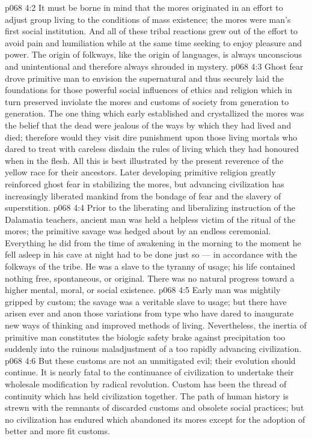 \vs p068 4:2 It must be borne in mind that the mores originated in an effort to adjust group living to the conditions of mass existence; the mores were man’s first social institution. And all of these tribal reactions grew out of the effort to avoid pain and humiliation while at the same time seeking to enjoy pleasure and power. The origin of folkways, like the origin of languages, is always unconscious and unintentional and therefore always shrouded in mystery.
\vs p068 4:3 \pc Ghost fear drove primitive man to envision the supernatural and thus securely laid the foundations for those powerful social influences of ethics and religion which in turn preserved inviolate the mores and customs of society from generation to generation. The one thing which early established and crystallized the mores was the belief that the dead were jealous of the ways by which they had lived and died; therefore would they visit dire punishment upon those living mortals who dared to treat with careless disdain the rules of living which they had honoured when in the flesh. All this is best illustrated by the present reverence of the yellow race for their ancestors. Later developing primitive religion greatly reinforced ghost fear in stabilizing the mores, but advancing civilization has increasingly liberated mankind from the bondage of fear and the slavery of superstition.
\vs p068 4:4 Prior to the liberating and liberalizing instruction of the Dalamatia teachers, ancient man was held a helpless victim of the ritual of the mores; the primitive savage was hedged about by an endless ceremonial. Everything he did from the time of awakening in the morning to the moment he fell asleep in his cave at night had to be done just so --- in accordance with the folkways of the tribe. He was a slave to the tyranny of usage; his life contained nothing free, spontaneous, or original. There was no natural progress toward a higher mental, moral, or social existence.
\vs p068 4:5 Early man was mightily gripped by custom; the savage was a veritable slave to usage; but there have arisen ever and anon those variations from type who have dared to inaugurate new ways of thinking and improved methods of living. Nevertheless, the inertia of primitive man constitutes the biologic safety brake against precipitation too suddenly into the ruinous maladjustment of a too rapidly advancing civilization.
\vs p068 4:6 But these customs are not an unmitigated evil; their evolution should continue. It is nearly fatal to the continuance of civilization to undertake their wholesale modification by radical revolution. Custom has been the thread of continuity which has held civilization together. The path of human history is strewn with the remnants of discarded customs and obsolete social practices; but no civilization has endured which abandoned its mores except for the adoption of better and more fit customs.
